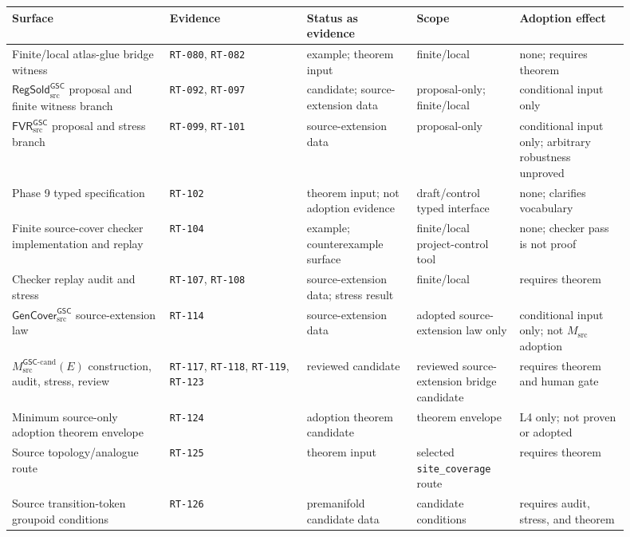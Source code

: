 \documentclass[11pt]{article}
\newcommand{\GSC}{\mathsf{GSC}}
\newcommand{\Msrc}{M_{\mathrm{src}}}
\newcommand{\Mgsccand}{M_{\mathrm{src}}^{\GSC\mbox{-}\mathrm{cand}}}
\newcommand{\GenCover}{\mathsf{GenCover}_{\mathrm{src}}^{\GSC}}
\newcommand{\RegSold}{\mathsf{RegSold}_{\mathrm{src}}^{\GSC}}
\newcommand{\FVR}{\mathsf{FVR}_{\mathrm{src}}^{\GSC}}
\begin{document}
\begin{longtable}{|p{0.23\linewidth}|p{0.20\linewidth}|p{0.16\linewidth}|p{0.15\linewidth}|p{0.16\linewidth}|}
\hline
\textbf{Surface} & \textbf{Evidence} & \textbf{Status as evidence} & \textbf{Scope} & \textbf{Adoption effect} \\
\hline
Finite/local atlas-glue bridge witness & \texttt{RT-080}, \texttt{RT-082} & example; theorem input & finite/local & none; requires theorem \\
\hline
\(\RegSold\) proposal and finite witness branch & \texttt{RT-092}, \texttt{RT-097} & candidate; source-extension data & proposal-only; finite/local & conditional input only \\
\hline
\(\FVR\) proposal and stress branch & \texttt{RT-099}, \texttt{RT-101} & source-extension data & proposal-only & conditional input only; arbitrary robustness unproved \\
\hline
Phase 9 typed specification & \texttt{RT-102} & theorem input; not adoption evidence & draft/control typed interface & none; clarifies vocabulary \\
\hline
Finite source-cover checker implementation and replay & \texttt{RT-104} & example; counterexample surface & finite/local project-control tool & none; checker pass is not proof \\
\hline
Checker replay audit and stress & \texttt{RT-107}, \texttt{RT-108} & source-extension data; stress result & finite/local & requires theorem \\
\hline
\(\GenCover\) source-extension law & \texttt{RT-114} & source-extension data & adopted source-extension law only & conditional input only; not \(\Msrc\) adoption \\
\hline
\(\Mgsccand(E)\) construction, audit, stress, review & \texttt{RT-117}, \texttt{RT-118}, \texttt{RT-119}, \texttt{RT-123} & reviewed candidate & reviewed source-extension bridge candidate & requires theorem and human gate \\
\hline
Minimum source-only adoption theorem envelope & \texttt{RT-124} & adoption theorem candidate & theorem envelope & L4 only; not proven or adopted \\
\hline
Source topology/analogue route & \texttt{RT-125} & theorem input & selected \texttt{site\_coverage} route & requires theorem \\
\hline
Source transition-token groupoid conditions & \texttt{RT-126} & premanifold candidate data & candidate conditions & requires audit, stress, and theorem \\
\hline
\end{longtable}
\end{document}
